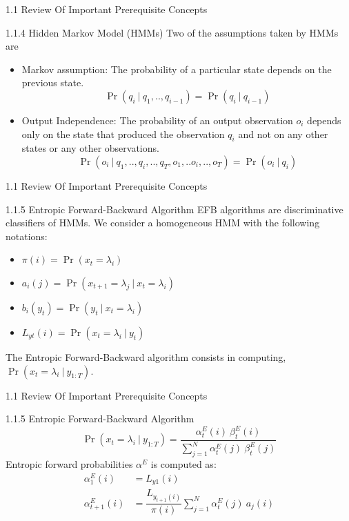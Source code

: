 \documentclass{beamer}
\providecommand{\pr}[1]{\ensuremath{\Pr\left(#1\right)}}
\begin{document}
\begin{frame}{1.1 Review Of Important Prerequisite Concepts}
\begin{block}{1.1.4 Hidden Markov Model (HMMs)}
Two of the assumptions taken by HMMs are 
\begin{itemize}
    \item  Markov assumption: The probability of a particular state depends on the previous state.\\
    \begin{equation}
       \pr{q_i\ |\ q_1,..,q_{i-1}} = \pr{q_i\ |\ q_{i-1}}
    \end{equation}
    \item Output Independence: The probability of an output observation $o_i$ depends only on the state that produced the observation $q_i$ and not on any other states or any other observations.\\
    \begin{equation}
        \pr{o_i\ |\ q_1,..,q_i,..,q_T,o_1,..o_i,..,o_T} = \pr{o_i\ |\ q_i}
    \end{equation}
\end{itemize}
\end{block}
\end{frame}
\begin{frame}{1.1 Review Of Important Prerequisite Concepts}
\begin{block}{1.1.5 Entropic Forward-Backward Algorithm}
EFB algorithms are discriminative classifiers of HMMs. We consider a homogeneous HMM with the following notations:
\begin{itemize}
    \item $\pi(i) = \pr{x_t = \lambda_i}$
    \item $a_i(j) = \pr{x_{t+1} = \lambda_j\ |\ x_t = \lambda_i}$
    \item $b_i(y_t) = \pr{y_t\ |\ x_t = \lambda_i}$
    \item $L_{yt}(i) = \pr{x_t = \lambda_i\ |\ y_t}$
\end{itemize}
The Entropic Forward-Backward algorithm consists in computing, $\pr{x_t = \lambda_i\ |\ y_{1:T}}$.
\end{block} 
\end{frame}
\begin{frame}{1.1 Review Of Important Prerequisite Concepts}
\begin{block}{1.1.5 Entropic Forward-Backward Algorithm}
\begin{equation}
    \pr{x_t = \lambda_i\ |\ y_{1:T}} = \dfrac{\alpha_{t}^{E}(i)\ \beta_{t}^{E}(i)}{\sum_{j=1}^{N}\alpha_{t}^{E}(j)\ \beta_{t}^{E}(j)}
\end{equation}
Entropic forward probabilities $\alpha^E$ is computed as:
\begin{equation}
\begin{split}
    \alpha_{1}^{E}(i) &= L_{y1}(i)\\
    \alpha_{t+1}^{E}(i) &= \dfrac{L_{y_{t+1}(i)}}{\pi(i)} \sum_{j=1}^{N}\alpha_{t}^{E}(j)\ a_j(i)
\end{split}
\end{equation}
\end{block} 
\end{frame}
\end{document}
